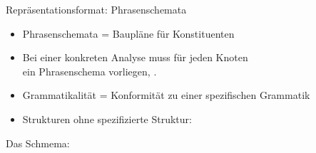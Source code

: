 \begin{frame}
  {Repräsentationsformat: Phrasenschemata}
  \pause
  \begin{itemize}[<+->]
    \item Phrasenschemata = \alert{Baupläne} für Konstituenten
    \item Bei einer konkreten Analyse muss für jeden Knoten\\
      ein Phrasenschema vorliegen, .
    \item \alert{Grammatikalität = Konformität zu einer spezifischen Grammatik}
    \item Strukturen ohne spezifizierte Struktur: 
  \end{itemize}
  \pause
  \Halbzeile
  \centering
  \begin{multicols}{2}
    \footnotesize Das Schmema:~
  \end{multicols}
\end{frame}

